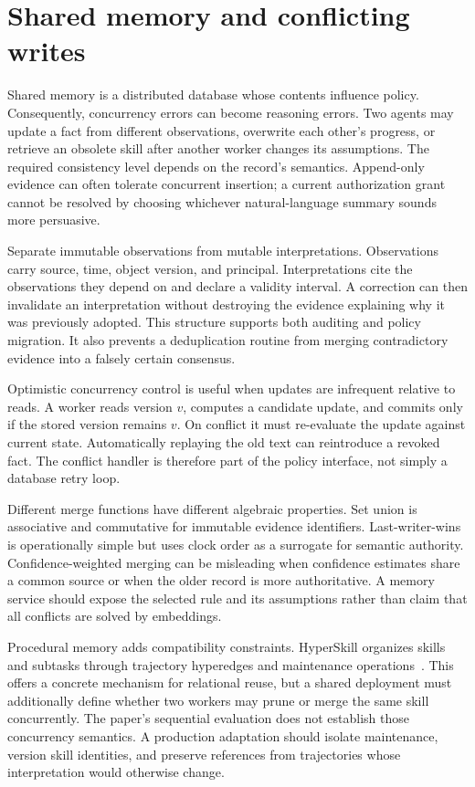 \section{Shared memory and conflicting writes}\label{sec:C21:sharedmemory}
Shared memory is a distributed database whose contents influence policy. Consequently, concurrency errors can become reasoning errors. Two agents may update a fact from different observations, overwrite each other's progress, or retrieve an obsolete skill after another worker changes its assumptions. The required consistency level depends on the record's semantics. Append-only evidence can often tolerate concurrent insertion; a current authorization grant cannot be resolved by choosing whichever natural-language summary sounds more persuasive.

Separate immutable observations from mutable interpretations. Observations carry source, time, object version, and principal. Interpretations cite the observations they depend on and declare a validity interval. A correction can then invalidate an interpretation without destroying the evidence explaining why it was previously adopted. This structure supports both auditing and policy migration. It also prevents a deduplication routine from merging contradictory evidence into a falsely certain consensus.

Optimistic concurrency control is useful when updates are infrequent relative to reads. A worker reads version $v$, computes a candidate update, and commits only if the stored version remains $v$. On conflict it must re-evaluate the update against current state. Automatically replaying the old text can reintroduce a revoked fact. The conflict handler is therefore part of the policy interface, not simply a database retry loop.

Different merge functions have different algebraic properties. Set union is associative and commutative for immutable evidence identifiers. Last-writer-wins is operationally simple but uses clock order as a surrogate for semantic authority. Confidence-weighted merging can be misleading when confidence estimates share a common source or when the older record is more authoritative. A memory service should expose the selected rule and its assumptions rather than claim that all conflicts are solved by embeddings.

Procedural memory adds compatibility constraints. HyperSkill organizes skills and subtasks through trajectory hyperedges and maintenance operations~\cite{xu2026hyperskill}. This offers a concrete mechanism for relational reuse, but a shared deployment must additionally define whether two workers may prune or merge the same skill concurrently. The paper's sequential evaluation does not establish those concurrency semantics. A production adaptation should isolate maintenance, version skill identities, and preserve references from trajectories whose interpretation would otherwise change.

